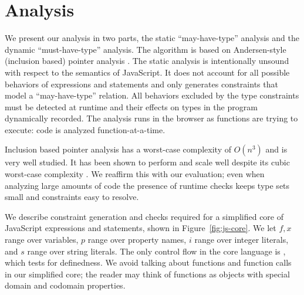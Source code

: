 \section{Analysis}
\label{sec:analysis}

We present our analysis in two parts, the static ``may-have-type'' analysis
and the dynamic ``must-have-type'' analysis. The algorithm is based on
Andersen-style (inclusion based) pointer analysis \cite{AndersenPhD}. The
static analysis is
intentionally unsound with respect to the semantics of
JavaScript. It does not account for all possible behaviors of expressions and
statements and only generates constraints that model a ``may-have-type''
relation. All behaviors excluded by the type constraints must be detected at
runtime and their effects on types in the program dynamically recorded. The
analysis runs in the browser as functions are trying to execute: code is
analyzed function-at-a-time.

Inclusion based pointer analysis has a worst-case complexity of $O(n^3)$
and is very
well studied. It has been shown to
perform and scale well despite its cubic worst-case complexity
\cite{Sridharan09}.
We reaffirm this with our evaluation;
even when analyzing large amounts of code the presence of runtime checks keeps type sets
small and constraints easy to resolve.

%
%
%
%
%
%

We describe constraint generation and checks required for a simplified core of
JavaScript expressions and statements, shown in Figure~\ref{fig:js-core}. We
let $f,x$ range over variables, $p$ range over property names, $i$ range over
integer literals, and $s$ range over string literals. The only control flow in
the core language is , which tests for definedness. We avoid talking
about functions and function calls in our simplified core; the reader may
think of functions as objects with special domain and codomain properties.


